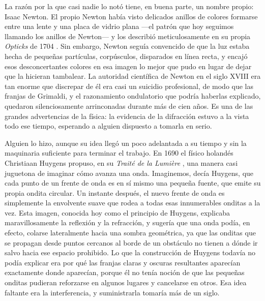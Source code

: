 	La razón por la que casi nadie lo notó tiene, en buena parte, un nombre propio: Isaac Newton. El propio Newton había visto delicados anillos de colores formarse entre una lente y una placa de vidrio plana —el patrón que hoy seguimos llamando los anillos de Newton— y los describió meticulosamente en su propia \textit{Opticks} de 1704 \cite{newton1704opticks}. Sin embargo, Newton seguía convencido de que la luz estaba hecha de pequeñas partículas, corpúsculos, disparados en línea recta, y encajó esos desconcertantes colores en esa imagen lo mejor que pudo en lugar de dejar que la hicieran tambalear. La autoridad científica de Newton en el siglo XVIII era tan enorme que discrepar de él era casi un suicidio profesional, de modo que las franjas de Grimaldi, y el razonamiento ondulatorio que podría haberlas explicado, quedaron silenciosamente arrinconadas durante más de cien años. Es una de las grandes advertencias de la física: la evidencia de la difracción estuvo a la vista todo ese tiempo, esperando a alguien dispuesto a tomarla en serio.

	Alguien lo hizo, aunque su idea llegó un poco adelantada a su tiempo y sin la maquinaria suficiente para terminar el trabajo. En 1690 el físico holandés Christiaan Huygens propuso, en su \textit{Traité de la Lumière} \cite{huygens1690traite}, una manera casi juguetona de imaginar cómo avanza una onda. Imaginemos, decía Huygens, que cada punto de un frente de onda es en sí mismo una pequeña fuente, que emite su propia ondita circular. Un instante después, el nuevo frente de onda es simplemente la envolvente suave que rodea a todas esas innumerables onditas a la vez. Esta imagen, conocida hoy como el principio de Huygens, explicaba maravillosamente la reflexión y la refracción, y sugería que una onda podía, en efecto, colarse lateralmente hacia una sombra geométrica, ya que las onditas que se propagan desde puntos cercanos al borde de un obstáculo no tienen a dónde ir salvo hacia ese espacio prohibido. Lo que la construcción de Huygens todavía no podía explicar era por qué las franjas claras y oscuras resultantes aparecían exactamente donde aparecían, porque él no tenía noción de que las pequeñas onditas pudieran reforzarse en algunos lugares y cancelarse en otros. Esa idea faltante era la interferencia, y suministrarla tomaría más de un siglo.

